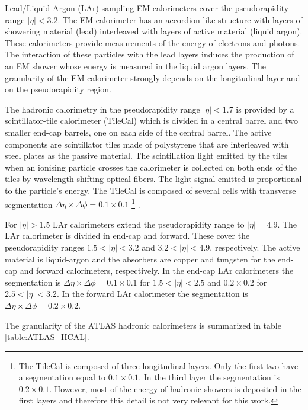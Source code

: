 Lead/Liquid-Argon (LAr) sampling EM calorimeters cover the pseudorapidity range $|\eta|<3.2$. The EM calorimeter has an accordion like structure with layers of showering material (lead) interleaved with layers of active material (liquid argon). These calorimeters provide measurements of the energy of electrons and photons. The interaction of these particles with the lead layers induces the production of an EM shower whose energy  is measured in the liquid argon layers. The granularity of the EM calorimeter strongly depends on the longitudinal layer and on the pseudorapidity region. 

The hadronic calorimetry in the pseudorapidity range $|\eta|<1.7$ is provided by a scintillator-tile calorimeter (TileCal) which is divided in a central barrel and two smaller end-cap barrels, one on each side of the central barrel. The active components are scintillator tiles made of polystyrene that are interleaved with steel plates as the passive material. The scintillation light emitted by the tiles when an ionising particle crosses the calorimeter is collected on both ends of the tiles by wavelength-shifting optical fibers. The light signal emitted is proportional to the particle's energy. The TileCal is composed of several cells with transverse segmentation $\Delta\eta\times\Delta\phi=0.1\times0.1$ \footnote{The TileCal is composed of three longitudinal layers. Only the first two have a segmentation equal to $0.1\times 0.1$. In the third layer the segmentation is $0.2\times 0.1$. However, most of the energy of hadronic showers is deposited in the first layers and therefore this detail is not very relevant for this work.} \cite{TileCalTech}. 

For $|\eta|>1.5$ LAr calorimeters extend the pseudorapidity range to $|\eta|=4.9$. The LAr calorimeter is divided in end-cap and forward. These cover the pseudorapidity ranges $1.5<|\eta|<3.2$ and $3.2<|\eta|<4.9$, respectively. The active material is liquid-argon and the absorbers are copper and tungsten for the end-cap and forward calorimeters, respectively. In the end-cap LAr calorimeters the segmentation is $\Delta\eta\times\Delta\phi= 0.1\times0.1$ for $1.5<|\eta|<2.5$ and $0.2\times0.2$ for $2.5<|\eta|<3.2$. In the forward LAr calorimeter the segmentation is $\Delta\eta\times\Delta\phi= 0.2\times0.2$. 

The granularity of the ATLAS hadronic calorimeters is summarized in table \ref{table:ATLAS_HCAL}.

\renewcommand{\arraystretch}{1.2}


